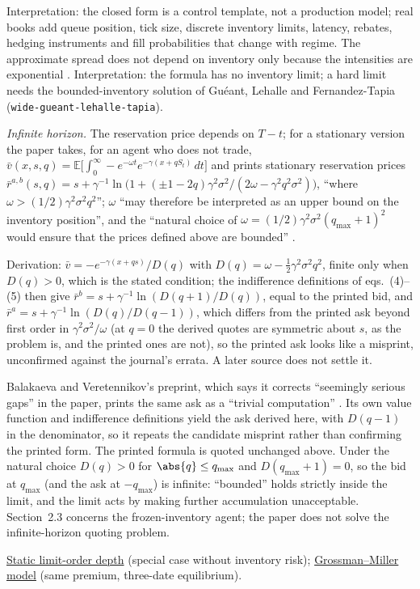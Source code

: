\begin{qfmodel}
 Interpretation: the closed form is a control template, not a production model; real books add queue position, tick size, discrete inventory limits, latency, rebates, hedging instruments and fill probabilities that change with regime. The approximate spread does not depend on inventory only because the intensities are exponential \citep[sec.~3.2, p.~221]{s6-stoikov}. Interpretation: the formula has no inventory limit; a hard limit needs the bounded-inventory solution of Gu\'eant, Lehalle and Fernandez-Tapia (\nolinkurl{wide-gueant-lehalle-tapia}).

\emph{Infinite horizon.} The reservation price depends on $T-t$; for a stationary version the paper takes, for an agent who does not trade, $\bar v(x,s,q)=\mathbb E\big[\int_0^\infty-e^{-\omega t}e^{-\gamma(x+qS_t)}\,dt\big]$ and prints stationary reservation prices $\bar r^{a,b}(s,q)=s+\gamma^{-1}\ln\big(1+(\pm1-2q)\gamma^2\sigma^2/(2\omega-\gamma^2q^2\sigma^2)\big)$, ``where $\omega>(1/2)\gamma^2\sigma^2q^2$''; $\omega$ ``may therefore be interpreted as an upper bound on the inventory position'', and the ``natural choice of $\omega=(1/2)\gamma^2\sigma^2(q_{\max}+1)^2$ would ensure that the prices defined above are bounded'' \citep[sec.~2.3, p.~219]{s6-stoikov}.

Derivation: $\bar v=-e^{-\gamma(x+qs)}/D(q)$ with $D(q)=\omega-\tfrac12\gamma^2\sigma^2q^2$, finite only when $D(q)>0$, which is the stated condition; the indifference definitions of eqs.~(4)--(5) then give $\bar r^b=s+\gamma^{-1}\ln(D(q+1)/D(q))$, equal to the printed bid, and $\bar r^a=s+\gamma^{-1}\ln(D(q)/D(q-1))$, which differs from the printed ask beyond first order in $\gamma^2\sigma^2/\omega$ (at $q=0$ the derived quotes are symmetric about $s$, as the problem is, and the printed ones are not), so the printed ask looks like a misprint, unconfirmed against the journal's errata. A later source does not settle it.

Balakaeva and Veretennikov's preprint, which says it corrects ``seemingly serious gaps'' in the paper, prints the same ask as a ``trivial computation'' \citep[arXiv v1, 13 October 2025, Lemma~3, p.~4]{balakaeva-veretennikov-2025}. Its own value function \citep[Lemma~2, p.~3]{balakaeva-veretennikov-2025} and indifference definitions \citep[Definition~3, p.~3]{balakaeva-veretennikov-2025} yield the ask derived here, with $D(q-1)$ in the denominator, so it repeats the candidate misprint rather than confirming the printed form. The printed formula is quoted unchanged above. Under the natural choice $D(q)>0$ for $\abs{q}\le q_{\max}$ and $D(q_{\max}+1)=0$, so the bid at $q_{\max}$ (and the ask at $-q_{\max}$) is infinite: ``bounded'' holds strictly inside the limit, and the limit acts by making further accumulation unacceptable. Section~2.3 concerns the frozen-inventory agent; the paper does not solve the infinite-horizon quoting problem.

 \hyperref[mod:static-limit-order-depth]{Static limit-order depth} (special case without inventory risk); \hyperref[mod:grossman-miller]{Grossman--Miller model} (same premium, three-date equilibrium).


\end{qfmodel}

